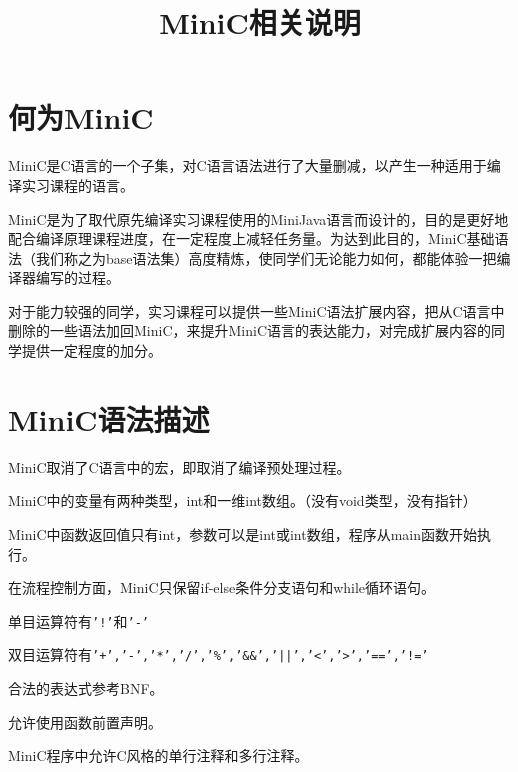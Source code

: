 \documentclass{ctexart}
\title{MiniC相关说明}
\date{}
\author{}
\begin{document}
\maketitle

\section{何为MiniC}
MiniC是C语言的一个子集，对C语言语法进行了大量删减，以产生一种适用于编译实习课程的语言。

MiniC是为了取代原先编译实习课程使用的MiniJava语言而设计的，目的是更好地配合编译原理课程进度，在一定程度上减轻任务量。为达到此目的，MiniC基础语法（我们称之为base语法集）高度精炼，使同学们无论能力如何，都能体验一把编译器编写的过程。

对于能力较强的同学，实习课程可以提供一些MiniC语法扩展内容，把从C语言中删除的一些语法加回MiniC，来提升MiniC语言的表达能力，对完成扩展内容的同学提供一定程度的加分。

\section{MiniC语法描述}
MiniC取消了C语言中的宏，即取消了编译预处理过程。

MiniC中的变量有两种类型，int和一维int数组。（没有void类型，没有指针）

MiniC中函数返回值只有int，参数可以是int或int数组，程序从main函数开始执行。

在流程控制方面，MiniC只保留if-else条件分支语句和while循环语句。

单目运算符有\texttt{'!'}和\texttt{'-'}

双目运算符有\texttt{'+','-','*','/','\%','\&\&','||','\textless','\textgreater','==','!='}

合法的表达式参考BNF。

允许使用函数前置声明。

MiniC程序中允许C风格的单行注释和多行注释。

\newpage
\end{document}
